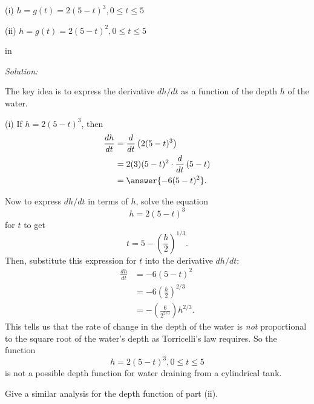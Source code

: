 \documentclass{ximera}
\newcommand{\pskip}{\vskip 0.1 in}
\begin{document}
\begin{question}
(i) $h = g(t) = 2 (5-t)^3 , 0\leq t \leq 5$

(ii) $h = g(t) = 2(5-t)^2, 0\leq t \leq 5$

\pskip

\emph{Solution:}

The key idea is to express the derivative $dh/dt$ as a function of the depth $h$ of the water. 

(i) If $h=2(5-t)^3$, then
\begin{align*}
    \frac{dh}{dt} &=\frac{d}{dt}\left( 2(5-t)^3  \right)  \\ 
                        &=     2(3)(5-t)^2  \cdot \frac{d}{dt} \left( 5-t  \right)  \\
                        &= \answer{-6 (5-t)^2} . 
\end{align*}
 
Now to express $dh/dt$ in terms of $h$, solve the equation 
\[
     h = 2(5-t)^3
\]
for $t$ to get
\[
     t = 5 - \left( \frac{h}{2} \right)^{1/3} .
\]
Then, substitute this expression for $t$ into the derivative $dh/dt$:
\begin{align*}
      \frac{dh}{dt} &= -6 (5-t)^2 \\
                          &= -6 \left( \frac{h}{2} \right)^{2/3} \\
                          &= - \left( \frac{6}{2^{2/3}}\right) h^{2/3} .
\end{align*}
This tells us that the rate of change in the depth of the water is \emph{not} proportional to the square root of the water's depth  as Torricelli's law requires. So the function
\[
      h = 2(5-t)^3, 0\leq t \leq 5
\]
is not a possible depth function for water draining from a cylindrical tank.

\begin{freeResponse}
Give a similar analysis for the depth function of part (ii).
\end{freeResponse}

\end{question}
\end{document}

